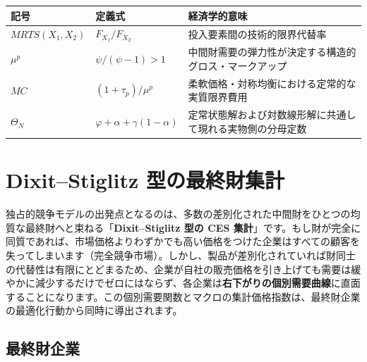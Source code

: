 \documentclass[
  japanese,
  lualatex,
  ja=standard,
  12pt,
  a4paper]{ltjsarticle}
\newcounter{none} %
\begin{document}
{\def\LTcaptype{none} %
\begin{longtable}[]{@{}
  >{\raggedright\arraybackslash}p{}
  >{\raggedright\arraybackslash}p{}
  >{\raggedright\arraybackslash}p{}@{}}
\toprule\noalign{}
\begin{minipage}[b]{\linewidth}\raggedright
記号
\end{minipage} & \begin{minipage}[b]{\linewidth}\raggedright
定義式
\end{minipage} & \begin{minipage}[b]{\linewidth}\raggedright
経済学的意味
\end{minipage} \\
\midrule\noalign{}
\endhead
\bottomrule\noalign{}
\endlastfoot
\(MRTS(X_1, X_2)\) & \(F_{X_1}/F_{X_2}\) &
投入要素間の技術的限界代替率 \\
\(\mu^p\) & \(\psi/(\psi-1) > 1\) &
中間財需要の弾力性が決定する構造的グロス・マークアップ \\
\(MC\) & \((1+\tau_p)/\mu^p\) &
柔軟価格・対称均衡における定常的な実質限界費用 \\
\(\Theta_N\) & \(\varphi+\alpha+\gamma(1-\alpha)\) &
定常状態解および対数線形解に共通して現れる実物側の分母定数 \\
\end{longtable}
}

\section{Dixit--Stiglitz
型の最終財集計}\label{dixitstiglitz-ux578bux306eux6700ux7d42ux8ca1ux96c6ux8a08}

独占的競争モデルの出発点となるのは、多数の差別化された中間財をひとつの均質な最終財へと束ねる「\textbf{Dixit--Stiglitz
型の CES
集計}」です。もし財が完全に同質であれば、市場価格よりわずかでも高い価格をつけた企業はすべての顧客を失ってしまいます（完全競争市場）。しかし、製品が差別化されていれば財同士の代替性は有限にとどまるため、企業が自社の販売価格を引き上げても需要は緩やかに減少するだけでゼロにはならず、各企業は\textbf{右下がりの個別需要曲線}に直面することになります。この個別需要関数とマクロの集計価格指数は、最終財企業の最適化行動から同時に導出されます。

\subsection{最終財企業}\label{ux6700ux7d42ux8ca1ux4f01ux696d}
\end{document}
